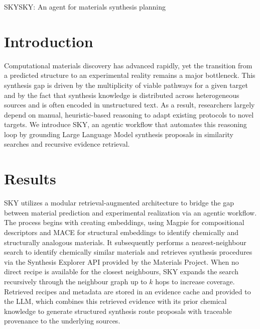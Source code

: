 \begin{teamsubmission}{SKY}{SKY: An agent for materials synthesis planning}

\section*{Introduction}
Computational materials discovery has advanced rapidly, yet the transition from a predicted structure to an experimental reality remains a major bottleneck. This synthesis gap is driven by the multiplicity of viable pathways for a given target and by the fact that synthesis knowledge is distributed across heterogeneous sources and is often encoded in unstructured text.\cite{park2025closing} As a result, researchers largely depend on manual, heuristic-based reasoning to adapt existing protocols to novel targets. We introduce SKY, an agentic workflow that automates this reasoning loop by grounding Large Language Model synthesis proposals in similarity searches and recursive evidence retrieval.

\section*{Results}
SKY utilizes a modular retrieval-augmented architecture to bridge the gap between material prediction and experimental realization via an agentic workflow. The process begins with creating embeddings, using Magpie\cite{ward2016general} for compositional descriptors and MACE\cite{batatia2023mace} for structural embeddings to identify chemically and structurally analogous materials. It subsequently performs a nearest-neighbour search to identify chemically similar materials and retrieves synthesis procedures via the Synthesis Explorer API provided by the Materials Project. When no direct recipe is available for the closest neighbours, SKY expands the search recursively through the neighbour graph up to $k$ hops to increase coverage. Retrieved recipes and metadata are stored in an evidence cache and provided to the LLM, which combines this retrieved evidence with its prior chemical knowledge to generate structured synthesis route proposals with traceable provenance to the underlying sources.


\end{teamsubmission}
